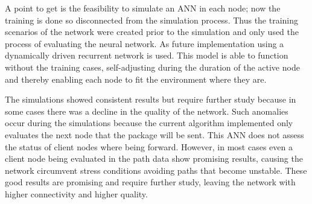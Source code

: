 \documentclass[10pt, conference, compsocconf]{IEEEtran}
\begin{document}
A point to get is the feasibility to simulate an ANN in each node; now the training is done so disconnected from the simulation process. Thus the training scenarios of the network were created prior to the simulation and only used the process of evaluating the neural network. As future implementation using a dynamically driven recurrent network is used. This model is able to function without the training cases, self-adjusting during the duration of the active node and thereby enabling each node to fit the environment where they are.

The simulations showed consistent results but require further study because in some cases there was a decline in the quality of the network. Such anomalies occur during the simulations because the current algorithm implemented only evaluates the next node that the package will be sent. This ANN does not assess the status of client nodes where being forward. However, in most cases even a client node being evaluated in the path data show promising results, causing the network circumvent stress conditions avoiding paths that become unstable. These good results are promising and require further study, leaving the network with higher connectivity and higher quality.








\end{document}
